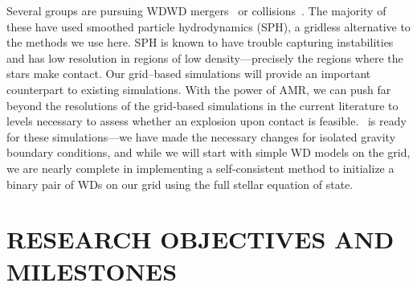 \documentclass[11pt,letterpaper,english]{article}
\begin{document}
Several groups are pursuing WDWD
mergers~\cite{yoon:2007,motl:2007,loren-aguilar:2009,shenetal+11} or
collisions~\cite{raskinetal+10,loren-aguilar:2010,rosswog:2009}. The
majority of these have used smoothed particle hydrodynamics (SPH), a
gridless alternative to the methods we use here.  SPH is known to have
trouble capturing instabilities and has low resolution in regions of
low density---precisely the regions where the stars make contact.  Our
grid--based simulations will provide an important counterpart to
existing simulations.  With the power of AMR, we can push far beyond
the resolutions of the grid-based simulations in the current
literature to levels necessary to assess whether an explosion upon
contact is feasible. \castro\ is ready for these simulations---we have
made the necessary changes for isolated gravity boundary conditions,
and while we will start with simple WD models on the grid, we are
nearly complete in implementing a self-consistent method to initialize a binary
pair of WDs on our grid using the full stellar equation of state.



\section{RESEARCH OBJECTIVES AND MILESTONES }  








\end{document}
